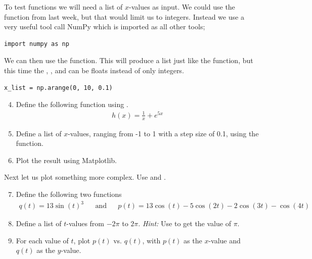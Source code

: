 \documentclass{article}
\begin{document}
To test functions we will need a list of $x$-values as input.
We could use the  function from last week, but that would limit us to
integers. Instead we use a very useful tool call NumPy which is imported as all other tools;

\begin{lstlisting}
import numpy as np
\end{lstlisting}

We can then use the  function.
This will produce a list just like the  function, but this time the
,
, and
can be floats instead of only integers.

\begin{lstlisting}
x_list = np.arange(0, 10, 0.1)
\end{lstlisting}

\begin{enumerate}
  \setcounter{enumi}{3}
  \item Define the following function using .
    \begin{align}
        h(x) = \frac{1}{x} + e^{5x}
    \end{align}

  \item Define a list of $x$-values, ranging from -1 to 1 with a step size of 0.1, using the  function.

  \item Plot the result using Matplotlib.

\end{enumerate}

Next let us plot something more complex. Use  and .

\begin{enumerate}
  \setcounter{enumi}{6}
  \item Define the following two functions
    \begin{align}
        q(t) = 13\sin(t)^3 && \text{and} && p(t) = 13\cos(t) - 5 \cos(2t) - 2 \cos(3t) - \cos(4t)
    \end{align}

  \item Define a list of $t$-values from $-2\pi$ to $2\pi$.
      {\em Hint:} Use  to get the value of $\pi$.

  \item For each value of $t$, plot $p(t)$ vs. $q(t)$, with $p(t)$ as the $x$-value and $q(t)$ as the $y$-value.

\end{enumerate}
\end{document}
